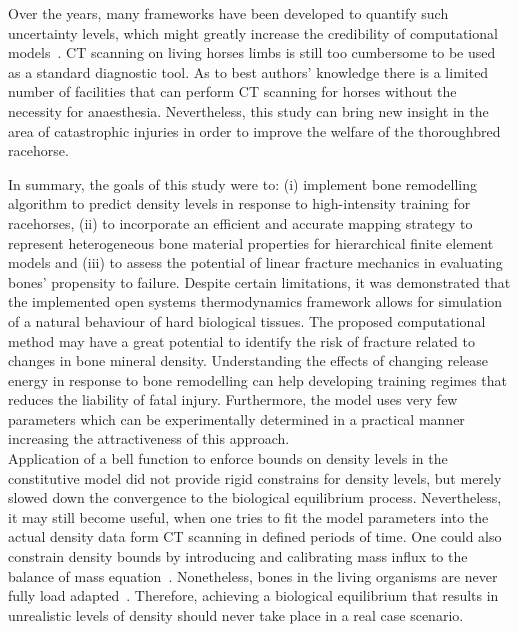 \documentclass[11pt]{acmeArticle}
\numberwithin{equation}{section}
\begin{document}
Over the years, many frameworks have been developed to quantify such uncertainty levels, which might greatly increase the credibility of computational models~\citep{wille2016uncertainty}. 
CT scanning on living horses limbs is still too cumbersome to be used as a standard diagnostic tool.
As to best authors' knowledge there is a limited number of facilities that can perform CT scanning for horses without the necessity for anaesthesia. 
Nevertheless, this study can bring new insight in the area of catastrophic injuries in order to improve the welfare of the thoroughbred racehorse. %

In summary, the goals of this study were to: (i) implement bone remodelling algorithm to predict density levels in response to high-intensity training for racehorses, (ii) to incorporate an efficient and accurate mapping strategy to represent heterogeneous bone material properties for hierarchical finite element models and (iii) to assess the potential of linear fracture mechanics in evaluating bones' propensity to failure. 
Despite certain limitations, it was demonstrated that the implemented open systems thermodynamics framework allows for simulation of a natural behaviour of hard biological tissues. 
The proposed computational method may have a great potential to identify the risk of fracture related to changes in bone mineral density. 
Understanding the effects of changing release energy in response to bone remodelling can help developing training regimes that reduces the liability of fatal injury. 
Furthermore, the model uses very few parameters which can be experimentally determined in a practical manner increasing the attractiveness of this approach.\\ 

Application of a bell function to enforce bounds on density levels in the constitutive model did not provide rigid constrains for density levels, but merely slowed down the convergence to the biological equilibrium process. 
Nevertheless, it may still become useful, when one tries to fit the model parameters into the actual density data form CT scanning in defined periods of time. 
One could also constrain density bounds by introducing and calibrating mass influx to the balance of mass equation~\citep{sharma2013adaptive}. 
Nonetheless, bones in the living organisms are never fully load adapted~\citep{christen2014bone}. 
Therefore, achieving a biological equilibrium that results in unrealistic levels of density should never take place in a real case scenario. \\
\end{document}
